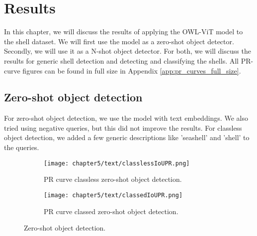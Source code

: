 \chapter{Results}
In this chapter, we will discuss the results of applying the OWL-ViT model to the shell dataset. We will first use the model as a zero-shot object detector. Secondly, we will use it as a N-shot object detector. For both, we will discuss the results for generic shell detection and detecting and classifying the shells. All PR-curve figures can be found in full size in Appendix \ref{app:pr_curves_full_size}.

\section{Zero-shot object detection}
For zero-shot object detection, we use the model with text embeddings. We also tried using negative queries, but this did not improve the results. For classless object detection, we added a few generic descriptions like 'seashell' and 'shell' to the queries.


\begin{figure}[h]
    \begin{adjustwidth}{-0.5in}{-0.5in}
        \centering
        \begin{subfigure}[b]{0.38\pdfpagewidth}
            \texttt{[image: chapter5/text/classlessIoUPR.png]}
            \caption{PR curve classless zero-shot object detection.}
            \label{fig:5_zero_shot_classless}
        \end{subfigure}
        \hfill
        \begin{subfigure}[b]{0.38\pdfpagewidth}
            \texttt{[image: chapter5/text/classedIoUPR.png]}
            \caption{PR curve classed zero-shot object detection.}
            \label{fig:5_zero_shot_classed}
        \end{subfigure}
    \end{adjustwidth}
    \caption{Zero-shot object detection.}
    \label{fig:5_zero_shot}
\end{figure}

